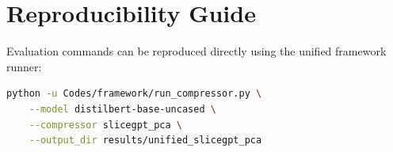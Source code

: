 \section{Reproducibility Guide}
Evaluation commands can be reproduced directly using the unified framework runner:
\begin{lstlisting}[language=bash]
python -u Codes/framework/run_compressor.py \
    --model distilbert-base-uncased \
    --compressor slicegpt_pca \
    --output_dir results/unified_slicegpt_pca
\end{lstlisting}
